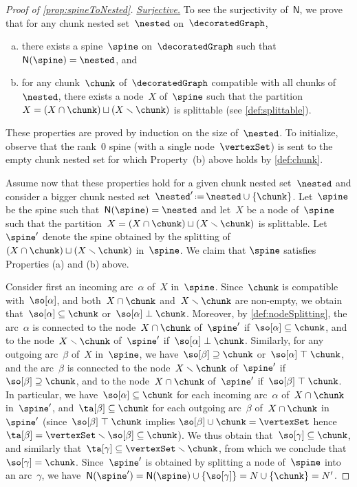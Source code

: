 \documentclass{amsart}
\theoremstyle{definition}
\newcommand{\ssm}{\smallsetminus} %
\newcommand{\eqdef}{\mbox{\,\raisebox{0.2ex}{\scriptsize\ensuremath{\mathrm:}}\ensuremath{=}\,}} %
\newcommand{\para}[1]{\medskip\noindent\uline{\textit{#1.}}} %
\newcommand{\negDisjoint}{\perp} %
\newcommand{\posDisjoint}{\;\top\;} %
\newcommand{\spineToNested}{\mathsf{N}} %
\begin{document}
\begin{proof}[Proof of \cref{prop:spineToNested}]
  \para{Surjective}
  To see the surjectivity of~$\spineToNested$, we prove that for any chunk nested set~$\nested$ on~$\decoratedGraph$,
\begin{enumerate}[(a)]
\item there exists a spine~$\spine$ on~$\decoratedGraph$ such that~$\spineToNested(\spine) = \nested$, and
\item for any chunk~$\chunk$ of~$\decoratedGraph$ compatible with all chunks of~$\nested$, there exists a node~$X$ of~$\spine$ such that the partition~$X = (X \cap \chunk) \sqcup (X \ssm \chunk)$ is splittable (see \cref{def:splittable}).
\end{enumerate}
  These properties are proved by induction on the size of~$\nested$.  
  To initialize, observe that the rank~$0$ spine (with a single node~$\vertexSet$) is sent to the empty chunk nested set for which Property~(b) above holds by \cref{def:chunk}.

  Assume now that these properties hold for a given chunk nested set~$\nested$ and consider a bigger chunk nested set~$\nested' \eqdef \nested \cup \{\chunk\}$.
  Let~$\spine$ be the spine such that~$\spineToNested(\spine) = \nested$ and let~$X$ be a node of~$\spine$ such that the partition~$X = (X \cap \chunk) \sqcup (X \ssm \chunk)$ is splittable.
  Let~$\spine'$ denote the spine obtained by the splitting of~$(X \cap \chunk) \sqcup (X \ssm \chunk)$ in~$\spine$.
  We claim that $\spine$ satisfies Properties (a) and (b) above.
  
  Consider first an incoming arc~$\alpha$ of~$X$ in~$\spine$.
  Since~$\chunk$ is compatible with~$\so[\alpha]$, and both~$X \cap \chunk$ and~$X \ssm \chunk$ are non-empty, we obtain that~$\so[\alpha] \subseteq \chunk$ or~$\so[\alpha] \negDisjoint \chunk$.
  Moreover, by \cref{def:nodeSplitting}, the arc~$\alpha$ is connected to the node~$X \cap \chunk$ of~$\spine'$ if~$\so[\alpha] \subseteq \chunk$, and to the node~$X \ssm \chunk$ of~$\spine'$ if~$\so[\alpha] \negDisjoint \chunk$.
  Similarly, for any outgoing arc~$\beta$ of~$X$ in~$\spine$, we have~$\so[\beta] \supseteq \chunk$ or~$\so[\alpha] \posDisjoint \chunk$, and the arc~$\beta$ is connected to the node~$X \ssm \chunk$ of~$\spine'$ if~$\so[\beta] \supseteq \chunk$, and to the node~$X \cap \chunk$ of~$\spine'$ if~$\so[\beta] \posDisjoint \chunk$.
  In particular, we have~$\so[\alpha] \subseteq \chunk$ for each incoming arc~$\alpha$ of~$X \cap \chunk$ in~$\spine'$, and~$\ta[\beta] \subseteq \chunk$ for each outgoing arc~$\beta$ of~$X \cap \chunk$ in~$\spine'$ (since~$\so[\beta] \posDisjoint \chunk$ implies $\so[\beta] \cup \chunk = \vertexSet$ hence $\ta[\beta] = \vertexSet \ssm \so[\beta] \subseteq \chunk$).
  We thus obtain that~$\so[\gamma] \subseteq \chunk$, and similarly that~$\ta[\gamma] \subseteq \vertexSet \ssm \chunk$, from which we conclude that $\so[\gamma] = \chunk$.
  Since~$\spine'$ is obtained by splitting a node of~$\spine$ into an arc~$\gamma$, we have~$\spineToNested(\spine') = \spineToNested(\spine) \cup \{\so[\gamma]\} = N \cup \{\chunk\} = N '$.


\end{proof}
\end{document}
